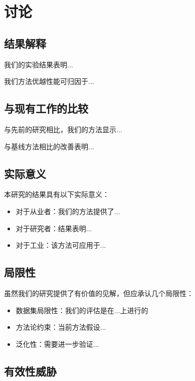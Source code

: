 \section{讨论}
\label{sec:discussion}


\subsection{结果解释}

我们的实验结果表明...

我们方法优越性能可归因于...

\subsection{与现有工作的比较}

与先前的研究\cite{ref1,ref2}相比，我们的方法显示...

与基线方法相比的改善表明...

\subsection{实际意义}

本研究的结果具有以下实际意义：

\begin{itemize}
    \item 对于从业者：我们的方法提供了...
    \item 对于研究者：结果表明...
    \item 对于工业：该方法可应用于...
\end{itemize}

\subsection{局限性}

虽然我们的研究提供了有价值的见解，但应承认几个局限性：

\begin{itemize}
    \item 数据集局限性：我们的评估是在...上进行的
    \item 方法论约束：当前方法假设...
    \item 泛化性：需要进一步验证...
\end{itemize}

\subsection{有效性威胁}

